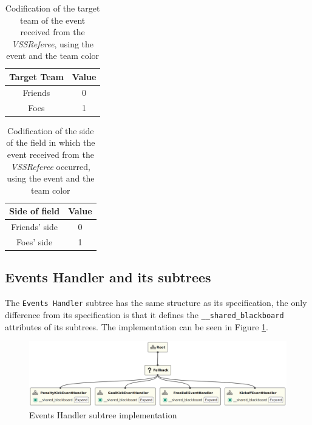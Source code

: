 \begin{table}[!htbp]
    \centering
    \begin{tabular}{c c}
        \toprule
        Target Team & Value \\ 
        \midrule
        Friends     & 0     \\ 
        Foes        & 1     \\ 
        \bottomrule
    \end{tabular}
    \caption{Codification of the target team of the event received from the \textit{VSSReferee}, using the event and the team color}
    \label{tab:target_team_event_codification}
\end{table}

\begin{table}[!htbp]
    \centering
    \begin{tabular}{c c}
        \toprule
        Side of field & Value \\ 
        \midrule
        Friends' side & 0     \\ 
        Foes' side    & 1     \\ 
        \bottomrule
    \end{tabular}
    \caption{Codification of the side of the field in which the event received from the \textit{VSSReferee} occurred, using the event and the team color}
    \label{tab:field_side_event_codification}
\end{table}

\subsection{Events Handler and its subtrees}

The \texttt{Events Handler} subtree has the same structure as its specification, the only difference from its specification is that it defines the \texttt{\_\_shared\_blackboard} attributes of its subtrees. The implementation can be seen in Figure \ref{fig:events_handler_impl}.

\begin{figure}[!h]
    \centering
    \includegraphics[width=1.0\linewidth]{images/implementation/EventsHandler.png}
    \caption{Events Handler subtree implementation}
    \label{fig:events_handler_impl}
\end{figure}

